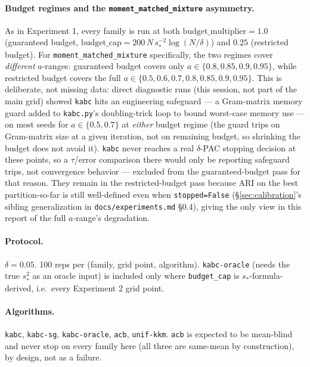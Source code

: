 \documentclass[11pt]{article}
\begin{document}
\paragraph{Budget regimes and the \texttt{moment\_matched\_mixture} asymmetry.}
As in Experiment 1, every family is run at both
$\text{budget\_multiplier}=1.0$ (guaranteed budget, $\text{budget\_cap} =
200\,N\,s_*^{-2}\log(N/\delta)$) and $0.25$ (restricted budget). For
\texttt{moment\_matched\_mixture} specifically, the two regimes cover
\emph{different} $a$-ranges: guaranteed budget covers only $a \in
\{0.8,0.85,0.9,0.95\}$, while restricted budget covers the full $a \in
\{0.5,0.6,0.7,0.8,0.85,0.9,0.95\}$. This is deliberate, not missing data: direct
diagnostic runs (this session, not part of the main grid) showed \texttt{kabc}
hits an engineering safeguard --- a Gram-matrix memory guard added to
\texttt{kabc.py}'s doubling-trick loop to bound worst-case memory use --- on
most seeds for $a\in\{0.5,0.7\}$ at \emph{either} budget regime (the guard
trips on Gram-matrix size at a given iteration, not on remaining budget, so
shrinking the budget does not avoid it). \texttt{kabc} never reaches a real
$\delta$-PAC stopping decision at these points, so a $\tau$/error comparison
there would only be reporting safeguard trips, not convergence behavior ---
excluded from the guaranteed-budget pass for that reason. They remain in the
restricted-budget pass because ARI on the best partition-so-far is still
well-defined even when \texttt{stopped=False} (\S\ref{sec:calibration}'s
sibling generalization in \texttt{docs/experiments.md} \S0.4), giving the only
view in this report of the full $a$-range's degradation.

\paragraph{Protocol.} $\delta=0.05$. 100 reps per (family, grid point,
algorithm). \texttt{kabc-oracle} (needs the true $s_*^2$ as an oracle input)
is included only where \texttt{budget\_cap} is $s_*$-formula-derived, i.e.\
every Experiment 2 grid point.

\paragraph{Algorithms.} \texttt{kabc}, \texttt{kabc-sg}, \texttt{kabc-oracle},
\texttt{acb}, \texttt{unif-kkm}. \texttt{acb} is expected to be mean-blind and
never stop on every family here (all three are same-mean by construction), by
design, not as a failure.
\end{document}
